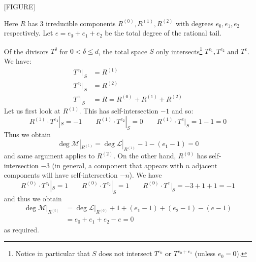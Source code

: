[FIGURE]

Here $R$ has $3$ irreducible components $R^{(0)},R^{(1)},R^{(2)}$ with degrees $e_0,e_1,e_2$ respectively. Let $e = e_0+e_1+e_2$ be the total degree of the rational tail.

Of the divisors $T^{\delta}$ for $0<\delta\leq d$, the total space $S$ only intersects\footnote{Notice in particular that $S$ does not intersect $T^{e_0}$ or $T^{e_0+e_1}$ (unless $e_0=0$).} $T^{e_1}, T^{e_2}$ and $T^e$. We have:
\begin{align*}
T^{e_1}|_S & = R^{(1)} \\
T^{e_2}|_S & = R^{(2)} \\
T^e|_S & = R = R^{(0)} + R^{(1)} + R^{(2)}
\end{align*}
Let us first look at $R^{(1)}$. This has self-intersection $-1$ and so:
\begin{equation*} R^{(1)} \cdot T^{e_1}|_S = -1 \qquad R^{(1)} \cdot T^{e_2}|_S = 0 \qquad R^{(1)} \cdot T^e|_S = 1-1 = 0 \end{equation*}
Thus we obtain
\begin{equation*} \deg \mathcal{M}|_{R^{(1)}} = \deg \mathcal{L}|_{R^{(1)}} - 1 - (e_1 - 1) = 0 \end{equation*}
and same argument applies to $R^{(2)}$. On the other hand, $R^{(0)}$ has self-intersection $-3$ (in general, a component that appears with $n$ adjacent components will have self-intersection $-n$). We have
\begin{equation*} R^{(0)} \cdot T^{e_1}|_S = 1 \qquad R^{(0)} \cdot T^{e_2}|_S = 1 \qquad R^{(0)} \cdot T^e|_S = -3 + 1 + 1 = -1 \end{equation*}
and thus we obtain
\begin{align*} \deg \mathcal{M}|_{R^{(0)}} & = \deg \mathcal{L}|_{R^{(0)}} + 1 + (e_1 - 1) + (e_2 - 1) - (e-1) \\
& = e_0 + e_1 + e_2 - e = 0 \end{align*}
as required.

